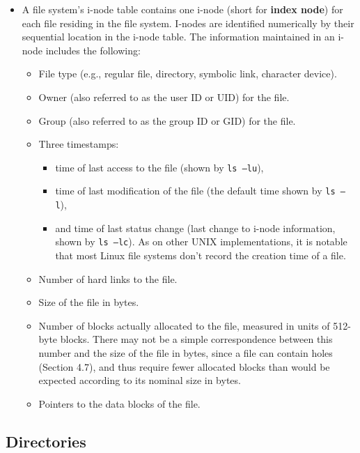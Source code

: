 \documentclass[]{article}
\begin{document}
\begin{itemize}
\item
  A file system's i-node table contains one i-node (short for
  \textbf{index node}) for each file residing in the file system.
  I-nodes are identified numerically by their sequential location in the
  i-node table. The information maintained in an i-node includes the
  following:

  \begin{itemize}
  \item
    File type (e.g., regular file, directory, symbolic link, character
    device).
  \item
    Owner (also referred to as the user ID or UID) for the file.
  \item
    Group (also referred to as the group ID or GID) for the file.
  \item
    Three timestamps:

    \begin{itemize}
    \item
      time of last access to the file (shown by \texttt{ls\ –lu}), 
    \item
      time of last modification of the file (the default time shown by
      \texttt{ls\ –l}), 
    \item
      and time of last status change (last change to i-node information,
      shown by \texttt{ls\ –lc}). As on other UNIX implementations, it
      is notable that most Linux file systems don't record the creation
      time of a file.
    \end{itemize}
  \item
    Number of hard links to the file.
  \item
    Size of the file in bytes.
  \item
    Number of blocks actually allocated to the file, measured in units
    of 512-byte blocks. There may not be a simple correspondence between
    this number and the size of the file in bytes, since a file can
    contain holes (Section 4.7), and thus require fewer allocated blocks
    than would be expected according to its nominal size in bytes.
  \item
    Pointers to the data blocks of the file.
  \end{itemize}
\end{itemize}

\subsection{\texorpdfstring{\textbf{Directories}}{Directories}}\label{header-n339}
\end{document}
